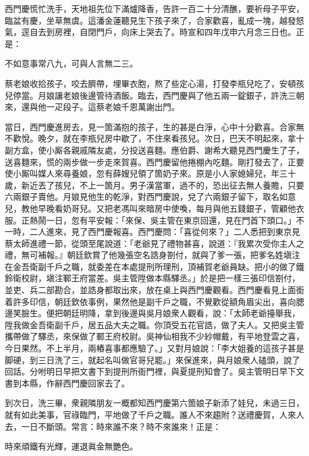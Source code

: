 西門慶慌忙洗手，天地祖先位下滿爐降香，告許一百二十分清醮，要祈母子平安，臨盆有慶，坐草無虞。{}這潘金蓮聽見生下孩子來了，合家歡喜，亂成一塊，越發怒氣，逕自去到房裡，自閉門戶，向床上哭去了。{}時宣和四年戊申六月念三日也。正是：

\begin{myquote}
不如意事常八九，可與人言無二三。
\end{myquote}

蔡老娘收拾孩子，咬去臍帶，埋畢衣胞，熬了些定心湯，打發李瓶兒吃了，安頓孩兒停當。月娘讓老娘後邊管待酒飯。臨去，西門慶與了他五兩一錠銀子，許洗三朝來，還與他一疋段子。這蔡老娘千恩萬謝出門。

當日，西門慶進房去，見一箇滿抱的孩子，生的甚是白淨，心中十分歡喜。合家無不歡悅。晚夕，就在李瓶兒房中歇了，不住來看孩兒。次日，巴天不明起來，拿十副方盒，使小厮各親戚隣友處，分投送喜麵。應伯爵、謝希大聽見西門慶生了子，送喜麵來，慌的兩步做一步走來賀喜。西門慶留他捲棚內吃麵。剛打發去了，正要使小厮叫媒人來尋養娘，忽有薛嫂兒領了箇奶子來。原是小人家媳婦兒，年三十歲，新近丟了孩兒，不上一箇月。男子漢當軍，過不的，恐出征去無人養贍，只要六兩銀子賣他。月娘見他生的乾淨，{}對西門慶說，兌了六兩銀子留下，取名如意兒，教他早晚看奶哥兒。又把老馮叫來暗房中使喚，每月與他五錢銀子，管顧他衣服。正熱鬧一日，忽有平安報：「來保、吳主管在東京回還，見在門首下頭口。」不一時，二人進來，見了西門慶報喜。西門慶問：「喜從何來？」二人悉把到東京見蔡太師進禮一節，從頭至尾說道：「老爺見了禮物甚喜，說道：『我累次受你主人之禮，無可補報。』朝廷欽賞了他幾張空名誥身劄付，就與了爹一張，把爹名姓塡注在金吾衛副千戶之職，就委差在本處提刑所理刑，頂補賀老爺員缺。把小的做了鐵鈴衛校尉，塡注鄆王府當差。吳主管陞做本縣驛丞。」於是把一樣三張印信劄付，並吏、兵二部勘合，並誥身都取出來，放在桌上與西門慶觀看。西門慶看見上面銜着許多印信，朝廷欽依事例，果然他是副千戶之職，不覺歡從額角眉尖出，喜向腮邊笑臉生。便把朝廷明降，拿到後邊與吳月娘衆人觀看，說：「太師老爺擡舉我，陞我做金吾衛副千戶，居五品大夫之職。你頂受五花官誥，做了夫人。又把吳主管攜帶做了驛丞，來保做了鄆王府校尉。吳神仙相我不少紗帽戴，有平地登雲之喜，今日果然。不上半月，兩樁喜事都應驗了。」又對月娘說：「李大姐養的這孩子甚是脚硬，到三日洗了三，就起名叫做官哥兒罷。」來保進來，與月娘衆人磕頭，說了回話。分咐明日早把文書下到提刑所衙門裡，與夏提刑知會了。吳主管明日早下文書到本縣，作辭西門慶回家去了。

到次日，洗三畢，衆親隣朋友一概都知西門慶第六箇娘子新添了娃兒，未過三日，就有如此美事，官祿臨門，平地做了千戶之職。誰人不來趨附？送禮慶賀，人來人去，一日不斷頭。常言：時來誰不來？時不來誰來！正是：

\begin{myquote}
時來頑鐵有光輝，運退眞金無艷色。
\end{myquote}

